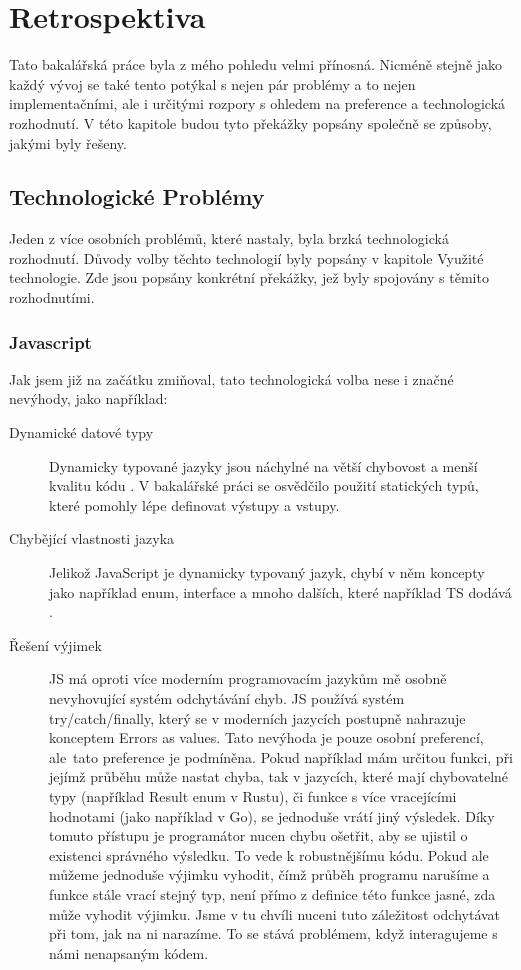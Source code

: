 \chapter{Retrospektiva} \label{retrospective}

Tato bakalářská práce byla z mého pohledu velmi přínosná. Nicméně stejně jako každý vývoj se také tento potýkal s nejen pár problémy a to nejen implementačními, ale i určitými rozpory s ohledem na preference a technologická rozhodnutí. V této kapitole budou tyto překážky popsány společně se způsoby, jakými byly řešeny.

\section{Technologické Problémy}

Jeden z více osobních problémů, které nastaly, byla brzká technologická rozhodnutí. Důvody volby těchto technologií byly popsány v kapitole Využité technologie. Zde jsou popsány konkrétní překážky, jež byly spojovány s těmito rozhodnutími.

\subsection{Javascript}
Jak jsem již na začátku zmiňoval, tato technologická volba nese i značné nevýhody, jako například:

\begin{description}
\item[Dynamické datové typy] 
Dynamicky typované jazyky jsou náchylné na větší chybovost a menší kvalitu kódu \cite{pang2018programming}. V bakalářské práci se osvědčilo použití statických typů, které pomohly lépe definovat výstupy a vstupy.
\item[Chybějící vlastnosti jazyka] 
Jelikož JavaScript je dynamicky typovaný jazyk, chybí v něm koncepty jako například enum, interface a mnoho dalších, které například TS dodává \cite{typescriptlangHandbookEnums, typescriptlangHandbookInterfaces}.
\item[Řešení výjimek]
JS má oproti více moderním programovacím jazykům mě osobně nevyhovující systém odchytávání chyb. JS používá systém try/catch/finally, který se v moderních jazycích postupně nahrazuje konceptem Errors as values. Tato nevýhoda je pouze osobní preferencí, ale~tato preference je podmíněna. Pokud například mám určitou funkci, při jejímž průběhu může nastat chyba, tak v jazycích, které mají chybovatelné typy (například Result enum v Rustu), či funkce s více vracejícími hodnotami (jako například v Go), se jednoduše vrátí jiný výsledek. Díky tomuto přístupu je programátor nucen chybu ošetřit, aby se ujistil o existenci správného výsledku. To vede k robustnějšímu kódu. Pokud ale můžeme jednoduše výjimku vyhodit, čímž průběh programu narušíme a funkce stále vrací stejný typ, není přímo z definice této funkce jasné, zda může vyhodit výjimku. Jsme v tu chvíli nuceni tuto záležitost odchytávat při tom, jak na ni narazíme. To se stává problémem, když interagujeme s námi nenapsaným kódem.
\end{description}

